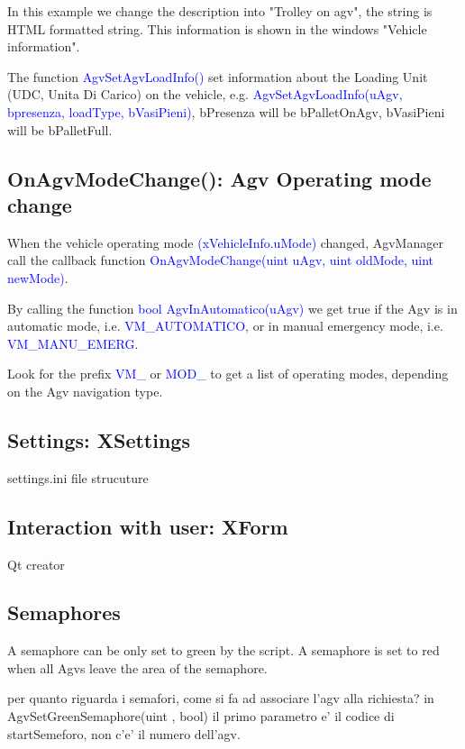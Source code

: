 In this example we change the description into "Trolley on agv", the string is HTML formatted string. This information is shown in the windows "Vehicle information".

The function \textcolor{blue}{AgvSetAgvLoadInfo()} set information about the Loading Unit (UDC, Unita Di Carico) on the vehicle, e.g. \textcolor{blue}{AgvSetAgvLoadInfo(uAgv, bpresenza, loadType, bVasiPieni)}, bPresenza will be bPalletOnAgv, bVasiPieni will be bPalletFull.

%
\subsection{OnAgvModeChange(): Agv Operating mode change}
When the vehicle operating mode \textcolor{blue}{(xVehicleInfo.uMode)} changed, AgvManager call the callback function \textcolor{blue}{OnAgvModeChange(uint uAgv, uint oldMode, uint newMode)}.

By calling the function \textcolor{blue}{bool AgvInAutomatico(uAgv)} we get true if the Agv is in automatic mode, i.e. \textcolor{blue}{VM\_AUTOMATICO}, or in manual emergency mode, i.e. \textcolor{blue}{VM\_MANU\_EMERG}.

Look for the prefix \textcolor{blue}{VM\_} or \textcolor{blue}{MOD\_} to get a list of operating modes, depending on the Agv navigation type.

%
\subsection{Settings: XSettings}

settings.ini file strucuture

%
\subsection{Interaction with user: XForm}
Qt creator

%
\subsection{Semaphores}
A semaphore can be only set to green by the script. A semaphore is set to red when all Agvs leave the area of the semaphore.

per quanto riguarda i semafori, come si fa ad associare l'agv alla richiesta? in AgvSetGreenSemaphore(uint , bool) il primo parametro e' il codice di startSemeforo, non c'e' il numero dell'agv.

